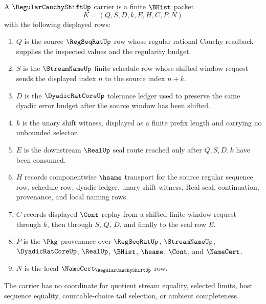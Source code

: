 \begin{definition}
\label{def:regular-cauchy-shift-carrier}
A $\RegularCauchyShiftUp$ carrier is a finite $\BHist$ packet
$$
K=(Q,S,D,k,E,H,C,P,N)
$$
with the following displayed rows:
\begin{enumerate}
\item $Q$ is the source $\RegSeqRatUp$ row whose regular rational Cauchy readback supplies the inspected values and the regularity budget.
\item $S$ is the $\StreamNameUp$ finite schedule row whose shifted window request sends the displayed index $n$ to the source index $n+k$.
\item $D$ is the $\DyadicRatCoreUp$ tolerance ledger used to preserve the same dyadic error budget after the source window has been shifted.
\item $k$ is the unary shift witness, displayed as a finite prefix length and carrying no unbounded selector.
\item $E$ is the downstream $\RealUp$ seal route reached only after $Q,S,D,k$ have been consumed.
\item $H$ records componentwise $\hsame$ transport for the source regular sequence row, schedule row, dyadic ledger, unary shift witness, Real seal, continuation, provenance, and local naming rows.
\item $C$ records displayed $\Cont$ replay from a shifted finite-window request through $k$, then through $S$, $Q$, $D$, and finally to the seal row $E$.
\item $P$ is the $\Pkg$ provenance over $\RegSeqRatUp$, $\StreamNameUp$, $\DyadicRatCoreUp$, $\RealUp$, $\BHist$, $\hsame$, $\Cont$, and $\NameCert$.
\item $N$ is the local $\NameCert_{\RegularCauchyShiftUp}$ row.
\end{enumerate}
The carrier has no coordinate for quotient stream equality, selected limits, host sequence equality, countable-choice tail selection, or ambient completeness.
\end{definition}


